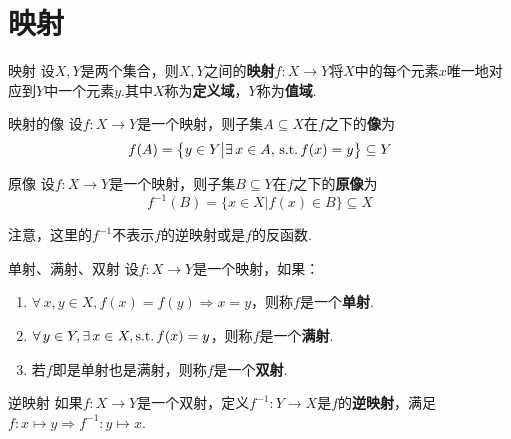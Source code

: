 \section{映射}

\begin{definition}{映射}
    设$X,Y$是两个集合，则$X,Y$之间的\textbf{映射}$f:X\to Y$将$X$中的每个元素$x$唯一地对应到$Y$中一个元素$y$.其中$X$称为\textbf{定义域}，$Y$称为\textbf{值域}.
\end{definition}

\begin{definition}{映射的像}
    设$f:X\to Y$是一个映射，则子集$A\subseteq X$在$f$之下的\textbf{像}为
    \[f(A)=\big\{y\in Y\big|\exists\, x\in A,\,\operatorname{\text{s.t.}} f(x)=y \big\}\subseteq Y\]
\end{definition}

\begin{definition}{原像}
    设$f:X\to Y$是一个映射，则子集$B\subseteq Y$在$f$之下的\textbf{原像}为
    \[f^{-1}(B)=\big\{x\in X\big|f(x)\in B \big\}\subseteq X\]
\end{definition}

\begin{notice}
    注意，这里的$f^{-1}$不表示$f$的逆映射或是$f$的反函数.
\end{notice}

\begin{definition}{单射、满射、双射}
    设$f:X\to Y$是一个映射，如果：
    \begin{enumerate}
        \item $\forall\, x,y\in X,f(x)=f(y)\Rightarrow x=y$，则称$f$是一个\textbf{单射}.
        \item $\forall\,y\in Y,\exists\, x\in X,\operatorname{\text{s.t.}} f(x)=y$，则称$f$是一个\textbf{满射}.
        \item 若$f$即是单射也是满射，则称$f$是一个\textbf{双射}.
    \end{enumerate}
\end{definition}






\begin{definition}{逆映射}
    如果$f:X\to Y$是一个双射，定义$f^{-1}:Y\to X$是$f$的\textbf{逆映射}，满足$f:x\mapsto y \Rightarrow f^{-1}:y\mapsto x$.
\end{definition}

